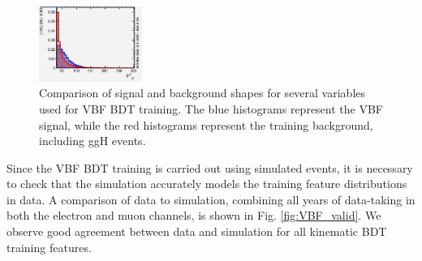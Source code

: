\begin{figure}[tb]
\begin{center}
		\includegraphics[width=0.3\textwidth]{fig/MVA/ptj2_vbf.png}
	\end{center}
	\caption{Comparison of signal and background shapes for several variables used for VBF BDT training. The blue histograms represent the VBF signal, while the red histograms represent the training background, including ggH \hzg{} events.}
	\label{fig:vbf_bdt_features}
\end{figure}

Since the VBF BDT training is carried out using simulated events, it is necessary to check that the simulation accurately models the training feature distributions in data. 
A comparison of data to simulation, combining all years of data-taking in both the electron and muon channels, is shown in Fig. \ref{fig:VBF_valid}. We observe good agreement between
data and simulation for all kinematic BDT training features. 

